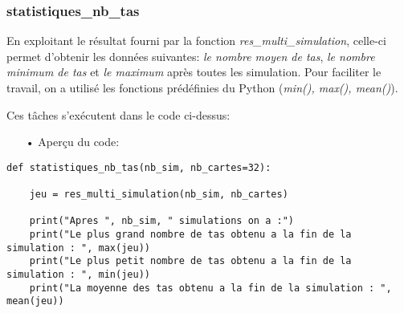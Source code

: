 \subsubsection{statistiques\_nb\_tas}
En exploitant le résultat fourni par la fonction \emph{res\_multi\_simulation}, celle-ci permet d'obtenir les données suivantes: \emph{le nombre moyen de tas}, \emph{le nombre minimum de tas} et \emph{le maximum} après toutes les simulation. Pour faciliter le travail, on a utilisé les fonctions prédéfinies du Python (\emph{min(), max(), mean()}).
\par Ces tâches s'exécutent dans le code ci-dessus:
	\\
	\begin{itemize}
	\color{blue}\item[•]Aperçu du code:
	\end{itemize}
	
	\lstset{language=Python}
	\lstset{frame=lines}
	\lstset{basicstyle=\footnotesize}
	\begin{lstlisting}
def statistiques_nb_tas(nb_sim, nb_cartes=32):
    
    jeu = res_multi_simulation(nb_sim, nb_cartes)

    print("Apres ", nb_sim, " simulations on a :")
    print("Le plus grand nombre de tas obtenu a la fin de la simulation : ", max(jeu))
    print("Le plus petit nombre de tas obtenu a la fin de la simulation : ", min(jeu))
    print("La moyenne des tas obtenu a la fin de la simulation : ", mean(jeu))
	\end{lstlisting}	
